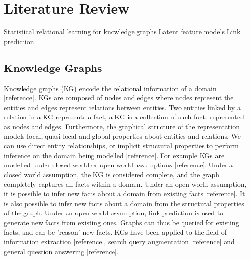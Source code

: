 
\chapter{Literature Review}

\ifpdf
    \graphicspath{{Chapter2/Figs/Raster/}{Chapter2/Figs/PDF/}{Chapter2/Figs/}}
\else
    \graphicspath{{Chapter2/Figs/Vector/}{Chapter2/Figs/}}
\fi
Statistical relational learning for knowledge graphs \newline
Latent feature models \newline
Link prediction

\section{Knowledge Graphs}
Knowledge graphs (KG) encode the relational information of a domain [reference]. KGs are composed of nodes and edges where nodes represent the entities and edges represent relations between entities. Two entities linked by a relation in a KG represents a fact, a KG is a collection of such facts represented as nodes and edges. Furthermore, the graphical structure of the representation models local, quasi-local and global properties about entities and relations. We can use direct entity relationships, or implicit structural properties to perform inference on the domain being modelled [reference]. For example %
\newline
KGs are modelled under closed world or open world assumptions [reference]. Under a closed world assumption, the KG is considered complete, and the graph completely captures all facts within a domain. Under an open world assumption, it is possible to infer new facts about a domain from existing facts [reference]. It is also possible to infer new facts about a domain from the structural properties of the graph. Under an open world assumption, link prediction is used to generate new facts from existing ones. Graphs can thus be queried for existing facts, and can be 'reason' new facts.
KGs have been applied to the field of information extraction [reference], search query augmentation [reference] and general question answering [reference].  \newline

